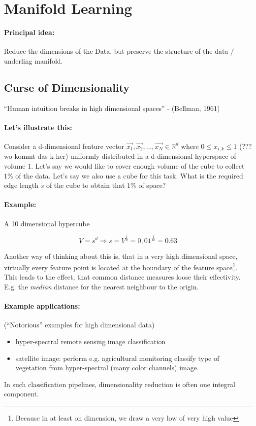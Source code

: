 
\section*{Manifold Learning}
\paragraph{Principal idea:} Reduce the dimensions of the Data, but preserve the structure of the data / underling manifold.

\subsection*{Curse of Dimensionality}
``Human intuition breaks in high dimensional spaces'' - (Bellman, 1961)

\paragraph{Let's illustrate this:}
Consider a d-dimensional feature vector $\vec{x_1}, \vec{x_2}, \dots, \vec{x_N} \in \mathbb{R}^d$ where $0 \le x_{i,k} \le 1$ (??? wo kommt das k her) uniformly distributed in a d-dimensional hyperspace of volume 1.
Let's say we would like to cover enough volume of  the cube to collect $1\%$ of the data. Let's say we also use a cube for this task. What is the required edge length $s$ of the cube to obtain that $1\%$ of space?

\paragraph{Example:}
A 10 dimensional hypercube

\begin{equation*}
    V=s^d \Rightarrow s = V^{\frac{1}{d}} = 0,01^{\frac{1}{10}} = 0.63
\end{equation*}

Another way of thinking about this is, that in a very high dimensional space, virtually every feature point is located at the boundary of the feature space\footnote{Because in at least on dimension, we draw a very low of very high value}. This leads to the effect, that common distance measures loose their  effectivity. E.g. the \textit{median} distance for the nearest neighbour to the origin.

\paragraph{Example applications:}
(``Notorious'' examples for high dimensional data)

\begin{itemize}
    \item hyper-spectral remote sensing image classification
    \item satellite image:  perform e.g. agricultural monitoring classify type of vegetation from hyper-spectral (many color channels) image.
\end{itemize}

In such classification pipelines, dimensionality reduction is often one integral component.
